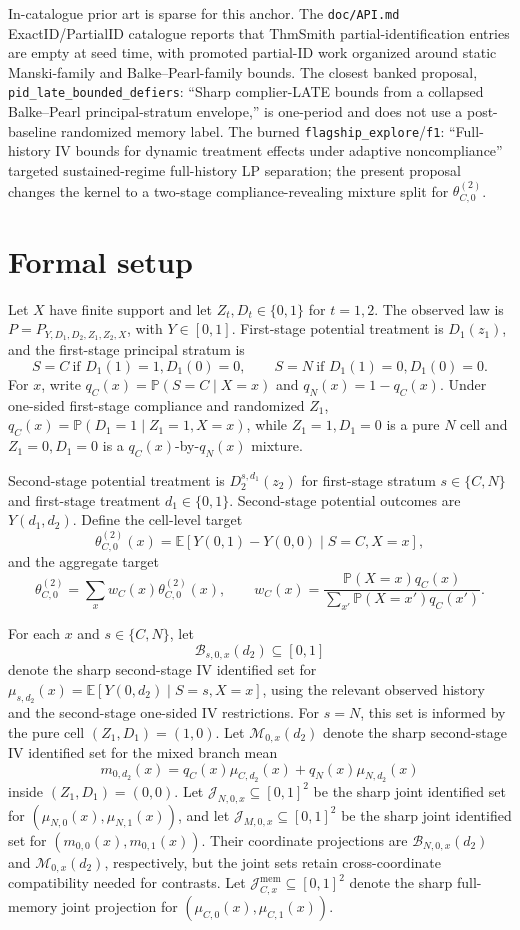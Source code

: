 \documentclass[11pt]{article}
\newcommand{\E}{\mathbb{E}}
\renewcommand{\Pr}{\mathbb{P}}
\theoremstyle{definition}
\theoremstyle{plain}
\theoremstyle{remark}
\begin{document}
In-catalogue prior art is sparse for this anchor.  The \texttt{doc/API.md} ExactID/PartialID catalogue reports that ThmSmith partial-identification entries are empty at seed time, with promoted partial-ID work organized around static Manski-family and Balke--Pearl-family bounds.  The closest banked proposal, \texttt{pid\_late\_bounded\_defiers}: ``Sharp complier-LATE bounds from a collapsed Balke--Pearl principal-stratum envelope,'' is one-period and does not use a post-baseline randomized memory label.  The burned \texttt{flagship\_explore}/\texttt{f1}: ``Full-history IV bounds for dynamic treatment effects under adaptive noncompliance'' targeted sustained-regime full-history LP separation; the present proposal changes the kernel to a two-stage compliance-revealing mixture split for \(\theta_{C,0}^{(2)}\).

\section{Formal setup}
Let \(X\) have finite support and let \(Z_t,D_t\in\{0,1\}\) for \(t=1,2\).  The observed law is \(P=P_{Y,D_1,D_2,Z_1,Z_2,X}\), with \(Y\in[0,1]\).  First-stage potential treatment is \(D_1(z_1)\), and the first-stage principal stratum is
\[
S=C\ \text{if }D_1(1)=1,D_1(0)=0,\qquad
S=N\ \text{if }D_1(1)=0,D_1(0)=0.
\]
For \(x\), write \(q_C(x)=\Pr(S=C\mid X=x)\) and \(q_N(x)=1-q_C(x)\).  Under one-sided first-stage compliance and randomized \(Z_1\), \(q_C(x)=\Pr(D_1=1\mid Z_1=1,X=x)\), while \(Z_1=1,D_1=0\) is a pure \(N\) cell and \(Z_1=0,D_1=0\) is a \(q_C(x)\)-by-\(q_N(x)\) mixture.

Second-stage potential treatment is \(D_2^{s,d_1}(z_2)\) for first-stage stratum \(s\in\{C,N\}\) and first-stage treatment \(d_1\in\{0,1\}\).  Second-stage potential outcomes are \(Y(d_1,d_2)\).  Define the cell-level target
\[
\theta_{C,0}^{(2)}(x)
=\E\!\left[Y(0,1)-Y(0,0)\mid S=C,X=x\right],
\]
and the aggregate target
\[
\theta_{C,0}^{(2)}
=\sum_x w_C(x)\theta_{C,0}^{(2)}(x),\qquad
w_C(x)=\frac{\Pr(X=x)q_C(x)}{\sum_{x'}\Pr(X=x')q_C(x')}.
\]

For each \(x\) and \(s\in\{C,N\}\), let
\[
\mathcal{B}_{s,0,x}(d_2)\subseteq[0,1]
\]
denote the sharp second-stage IV identified set for \(\mu_{s,d_2}(x)=\E[Y(0,d_2)\mid S=s,X=x]\), using the relevant observed history and the second-stage one-sided IV restrictions.  For \(s=N\), this set is informed by the pure cell \((Z_1,D_1)=(1,0)\).  Let \(\mathcal{M}_{0,x}(d_2)\) denote the sharp second-stage IV identified set for the mixed branch mean
\[
m_{0,d_2}(x)=q_C(x)\mu_{C,d_2}(x)+q_N(x)\mu_{N,d_2}(x)
\]
inside \((Z_1,D_1)=(0,0)\).  Let
\(\mathcal{J}_{N,0,x}\subseteq[0,1]^2\) be the sharp joint identified set for
\((\mu_{N,0}(x),\mu_{N,1}(x))\), and let
\(\mathcal{J}_{M,0,x}\subseteq[0,1]^2\) be the sharp joint identified set for
\((m_{0,0}(x),m_{0,1}(x))\).  Their coordinate projections are
\(\mathcal{B}_{N,0,x}(d_2)\) and \(\mathcal{M}_{0,x}(d_2)\), respectively, but the
joint sets retain cross-coordinate compatibility needed for contrasts.  Let
\(\mathcal{J}_{C,x}^{\mathrm{mem}}\subseteq[0,1]^2\) denote the sharp full-memory
joint projection for \((\mu_{C,0}(x),\mu_{C,1}(x))\).
\end{document}
